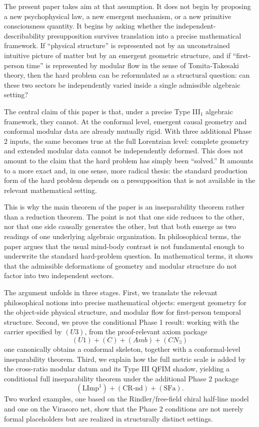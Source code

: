 \documentclass[12pt]{article}
\theoremstyle{definition}
\theoremstyle{remark}
\begin{document}
The present paper takes aim at that assumption. It does not begin by
proposing a new psychophysical law, a new emergent mechanism, or a new
primitive consciousness quantity. It begins by asking whether the
independent-describability presupposition survives translation into a
precise mathematical framework. If ``physical structure'' is represented
not by an unconstrained intuitive picture of matter but by an emergent
geometric structure, and if ``first-person time'' is represented by
modular flow in the sense of Tomita-Takesaki theory, then the hard
problem can be reformulated as a structural question: can these two
sectors be independently varied inside a single admissible algebraic
setting?

The central claim of this paper is that, under a precise Type III\(_1\)
algebraic framework, they cannot. At the conformal level, emergent
causal geometry and conformal modular data are already mutually rigid.
With three additional Phase 2 inputs, the same becomes true at the full
Lorentzian level: complete geometry and extended modular data cannot be
independently deformed. This does not amount to the claim that the hard
problem has simply been ``solved.'' It amounts to a more exact and, in
one sense, more radical thesis: the standard production form of the hard
problem depends on a presupposition that is not available in the
relevant mathematical setting.

This is why the main theorem of the paper is an inseparability theorem
rather than a reduction theorem. The point is not that one side reduces
to the other, nor that one side causally generates the other, but that
both emerge as two readings of one underlying algebraic organization. In
philosophical terms, the paper argues that the usual mind-body contrast
is not fundamental enough to underwrite the standard hard-problem
question. In mathematical terms, it shows that the admissible
deformations of geometry and modular structure do not factor into two
independent sectors.

The argument unfolds in three stages. First, we translate the relevant
philosophical notions into precise mathematical objects: emergent
geometry for the object-side physical structure, and modular flow for
first-person temporal structure. Second, we prove the conditional Phase
1 result: working with the carrier specified by \((U3)\), from the
proof-relevant axiom package \[
(U1)+(C)+(Amb)+(CN_\exists)
\] one canonically obtains a conformal skeleton, together with a
conformal-level inseparability theorem. Third, we explain how the full
metric scale is added by the cross-ratio modular datum and its Type III
QFIM shadow, yielding a conditional full inseparability theorem under
the additional Phase 2 package \[
(\mathrm{LImp}^1)+(\mathrm{CR\text{-}nd})+(\mathrm{SFa}).
\] Two worked examples, one based on the Rindler/free-field chiral
half-line model and one on the Virasoro net, show that the Phase 2
conditions are not merely formal placeholders but are realized in
structurally distinct settings.
\end{document}
